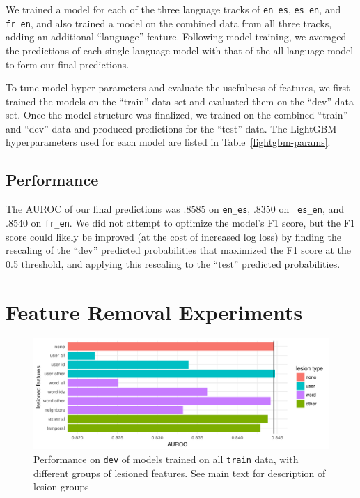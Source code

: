 \documentclass[11pt,a4paper]{article}
\begin{document}
We trained a model for each of the three language tracks of {\tt en\_es}, {\tt es\_en},
and {\tt fr\_en}, and also trained a model on the combined data from
all three tracks, adding an additional ``language'' feature. Following model
training, we averaged the predictions of each single-language model with that of
the all-language model to form our final predictions.

To tune model hyper-parameters and evaluate the usefulness of features, we first
trained the models on the ``train'' data set and evaluated them on the ``dev''
data set. Once the model structure was finalized, we trained on the combined
``train'' and ``dev'' data and produced predictions for the ``test'' data. The
LightGBM hyperparameters used for each model are listed in Table~\ref{lightgbm-params}.



\subsection{Performance}

The AUROC of our final predictions was $.8585$ on {\tt en\_es}, $.8350$ on {\tt
  es\_en}, and $.8540$ on {\tt fr\_en}. We did not attempt to optimize the model's
F1 score, but the F1 score could likely be improved (at the cost of
increased log loss) by finding the
rescaling of the ``dev'' predicted probabilities that maximized the F1 score at
the 0.5 threshold, and applying this rescaling to the ``test'' predicted probabilities.

\section{Feature Removal Experiments}

\begin{figure}[htp]
\includegraphics[width=\textwidth]{lesions.pdf}
\caption{Performance on {\tt dev} of models trained on all {\tt train} data,
  with different groups of lesioned features. See main text for description of
  lesion groups}
\label{fig:lesions}
\end{figure}
\end{document}

